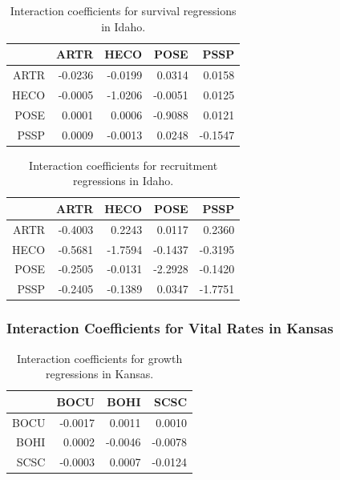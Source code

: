 \documentclass[12pt,]{article}
\begin{document}
\begin{table}[ht]
\centering
\caption{Interaction coefficients for survival regressions in Idaho.} 
\begin{tabular}{rrrrr}
  \hline
 & ARTR & HECO & POSE & PSSP \\ 
  \hline
ARTR & -0.0236 & -0.0199 & 0.0314 & 0.0158 \\ 
  HECO & -0.0005 & -1.0206 & -0.0051 & 0.0125 \\ 
  POSE & 0.0001 & 0.0006 & -0.9088 & 0.0121 \\ 
  PSSP & 0.0009 & -0.0013 & 0.0248 & -0.1547 \\ 
   \hline
\end{tabular}
\end{table}

\begin{table}[ht]
\centering
\caption{Interaction coefficients for recruitment regressions in Idaho.} 
\begin{tabular}{rrrrr}
  \hline
 & ARTR & HECO & POSE & PSSP \\ 
  \hline
ARTR & -0.4003 & 0.2243 & 0.0117 & 0.2360 \\ 
  HECO & -0.5681 & -1.7594 & -0.1437 & -0.3195 \\ 
  POSE & -0.2505 & -0.0131 & -2.2928 & -0.1420 \\ 
  PSSP & -0.2405 & -0.1389 & 0.0347 & -1.7751 \\ 
   \hline
\end{tabular}
\end{table}


\newpage{}

\subsubsection{Interaction Coefficients for Vital Rates in Kansas}

\begin{table}[ht]
\centering
\caption{Interaction coefficients for growth regressions in Kansas.} 
\begin{tabular}{rrrr}
  \hline
 & BOCU & BOHI & SCSC \\ 
  \hline
BOCU & -0.0017 & 0.0011 & 0.0010 \\ 
  BOHI & 0.0002 & -0.0046 & -0.0078 \\ 
  SCSC & -0.0003 & 0.0007 & -0.0124 \\ 
   \hline
\end{tabular}
\end{table}
\end{document}
